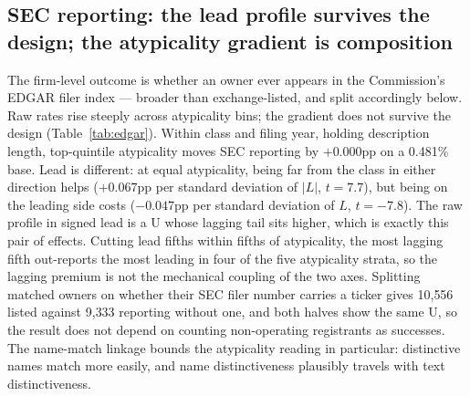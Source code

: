 \subsection{SEC reporting: the lead profile survives the design; the
atypicality gradient is composition}\label{sec:bluesea}

The firm-level outcome is whether an owner ever appears in the
Commission's EDGAR filer index --- broader than exchange-listed, and
split accordingly below. Raw rates rise steeply across atypicality
bins; the gradient does not survive the design
(Table~\ref{tab:edgar}). Within class and filing year, holding
description length, top-quintile atypicality moves SEC reporting by
$+0.000$pp on a 0.481\% base. Lead is different: at equal atypicality,
being far from the class in either direction helps ($+0.067$pp per
standard deviation of $|L|$, $t = 7.7$), but being on the leading side
costs ($-0.047$pp per standard deviation of $L$, $t = -7.8$). The raw
profile in signed lead is a U whose lagging tail sits higher, which is
exactly this pair of effects. Cutting lead fifths within fifths of
atypicality, the most lagging fifth out-reports the most leading in four
of the five atypicality strata, so the lagging premium is not the
mechanical coupling of the two axes. Splitting matched owners on whether their SEC
filer number carries a ticker gives 10{,}556 listed against 9{,}333
reporting without one, and both halves show the same U, so the result
does not depend on counting non-operating registrants as successes. The
name-match linkage bounds the atypicality reading in particular:
distinctive names match more easily, and name distinctiveness plausibly
travels with text distinctiveness.

